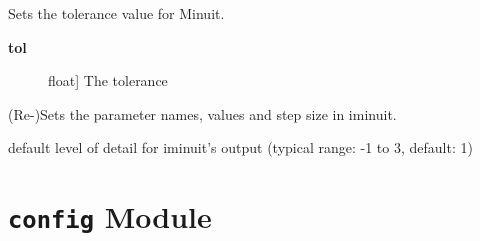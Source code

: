 \documentclass[a4paper,10pt,english]{sphinxmanual}
\begin{document}
\begin{fulllineitems}
\begin{fulllineitems}
\begin{description}
\end{description}

\end{fulllineitems}


\begin{fulllineitems}
\label{index:kafe.iminuit_wrapper.IMinuit.set_tolerance}
Sets the tolerance value for Minuit.
\begin{description}
\item[{\textbf{tol}}] \leavevmode{[}float{]}
The tolerance

\end{description}

\end{fulllineitems}


\begin{fulllineitems}
\label{index:kafe.iminuit_wrapper.IMinuit.update_parameter_data}
(Re-)Sets the parameter names, values and step size in iminuit.

\end{fulllineitems}


\end{fulllineitems}


\begin{fulllineitems}
\label{index:kafe.iminuit_wrapper.P_DETAIL_LEVEL}
default level of detail for iminuit's output
(typical range: -1 to 3, default: 1)

\end{fulllineitems}



\section{\texttt{config} Module}
\label{index:module-kafe.config}\label{index:config-module}\label{index:module-config}
\end{document}

